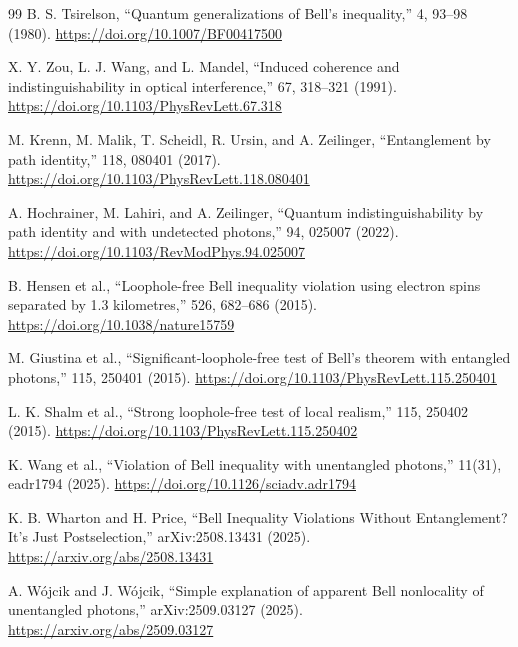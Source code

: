 \documentclass[11pt]{article}
\begin{document}
\begin{thebibliography}{99}
B. S. Tsirelson,
\newblock ``Quantum generalizations of Bell's inequality,''
 4, 93--98 (1980).
\newblock \url{https://doi.org/10.1007/BF00417500}

X. Y. Zou, L. J. Wang, and L. Mandel,
\newblock ``Induced coherence and indistinguishability in optical interference,''
 67, 318--321 (1991).
\newblock \url{https://doi.org/10.1103/PhysRevLett.67.318}

M. Krenn, M. Malik, T. Scheidl, R. Ursin, and A. Zeilinger,
\newblock ``Entanglement by path identity,''
 118, 080401 (2017).
\newblock \url{https://doi.org/10.1103/PhysRevLett.118.080401}

A. Hochrainer, M. Lahiri, and A. Zeilinger,
\newblock ``Quantum indistinguishability by path identity and with undetected photons,''
 94, 025007 (2022).
\newblock \url{https://doi.org/10.1103/RevModPhys.94.025007}

B. Hensen et al.,
\newblock ``Loophole-free Bell inequality violation using electron spins separated by 1.3 kilometres,''
 526, 682--686 (2015).
\newblock \url{https://doi.org/10.1038/nature15759}

M. Giustina et al.,
\newblock ``Significant-loophole-free test of Bell's theorem with entangled photons,''
 115, 250401 (2015).
\newblock \url{https://doi.org/10.1103/PhysRevLett.115.250401}

L. K. Shalm et al.,
\newblock ``Strong loophole-free test of local realism,''
 115, 250402 (2015).
\newblock \url{https://doi.org/10.1103/PhysRevLett.115.250402}

K. Wang et al.,
\newblock ``Violation of Bell inequality with unentangled photons,''
 11(31), eadr1794 (2025).
\newblock \url{https://doi.org/10.1126/sciadv.adr1794}

K. B. Wharton and H. Price,
\newblock ``Bell Inequality Violations Without Entanglement? It's Just Postselection,''
\newblock arXiv:2508.13431 (2025).
\newblock \url{https://arxiv.org/abs/2508.13431}

A. W\'ojcik and J. W\'ojcik,
\newblock ``Simple explanation of apparent Bell nonlocality of unentangled photons,''
\newblock arXiv:2509.03127 (2025).
\newblock \url{https://arxiv.org/abs/2509.03127}


\end{thebibliography}
\end{document}
